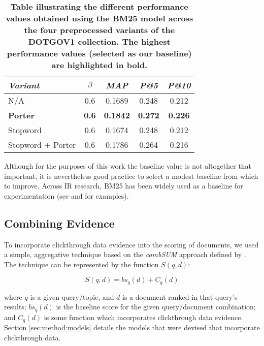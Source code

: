 \begin{table}[h]
	\renewcommand{\arraystretch}{1.3}
	\begin{center}
		\begin{small}
			\begin{tabularx}{\linewidth}{X|c|c|c|c}
				\textbf{\emph{Variant}} & \textbf{\emph{$\beta$}} & \textbf{\emph{MAP}} & \textbf{\emph{P@5}} & \textbf{\emph{P@10}}
				\tabularnewline
				\hline
				N/A & 0.6 & 0.1689 & 0.248 & 0.212 \tabularnewline \hline
				\textbf{Porter} & \textbf{0.6} & \textbf{0.1842} & \textbf{0.272} & \textbf{0.226} \tabularnewline \hline
				Stopword & 0.6 & 0.1674 & 0.248 & 0.212 \tabularnewline \hline
				Stopword + Porter & 0.6 & 0.1786 & 0.264 & 0.216 \tabularnewline
			\end{tabularx}
		\end{small}
	\end{center}
	
	\vspace{-0.4cm}
	\caption{\textbf{Table illustrating the different performance values obtained using the BM25 model across the four preprocessed variants of the DOTGOV1 collection. The highest performance values (selected as our baseline) are highlighted in bold.}}
	\label{tbl:baselines}
\end{table}

Although for the purposes of this work the baseline value is not altogether that important, it is nevertheless good practice to select a modest baseline from which to improve. Across IR research, BM25 has been widely used as a baseline for experimentation (see \cite{moon2010user_driven_ranking} and \cite{upstill2003queryindependent_evidence} for examples).

\subsection{Combining Evidence}
To incorporate clickthrough data evidence into the scoring of documents, we used a simple, aggregative technique based on the \emph{combSUM} approach defined by \citeauthor{shaw1993combining} \cite{shaw1993combining}. The technique can be represented by the function $S(q, d)$:

\vspace{-0.3cm}
\begin{equation}
	S(q, d) = bs_q(d) + C_q(d)
\end{equation}

\noindent
where $q$ is a given query/topic, and $d$ is a document ranked in that query's results; $bs_q(d)$ is the baseline score for the given query/document combination; and $C_q(d)$ is some function which incorporates clickthrough data evidence. Section \ref{sec:method:models} details the models that were devised that incorporate clickthrough data.

